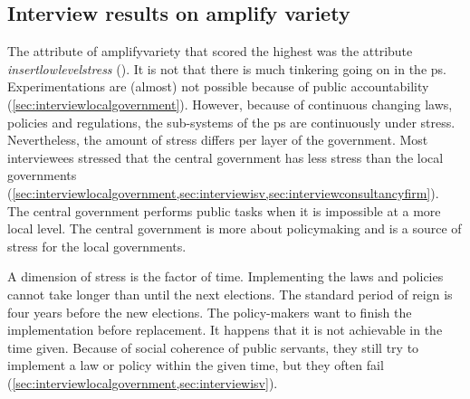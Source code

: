 \subsection{Interview results on amplify variety}
\label{sub:interviewresultsamplify}
The \gls{attribute} of \gls{amplifyvariety} that scored the highest was the \gls{attribute} \textit{\gls{insertlowlevelstress}} (). It is not that there is much tinkering going on in the \gls{ps}. Experimentations are (almost) not possible because of public accountability (\cref{sec:interviewlocalgovernment}). However, because of continuous changing laws, policies and regulations, the sub-systems of the \gls{ps} are continuously under stress. Nevertheless, the amount of stress differs per layer of the government. Most interviewees stressed that the central government has less stress than the local governments (\cref{sec:interviewlocalgovernment,sec:interviewisv,sec:interviewconsultancyfirm}). The central government performs public tasks when it is impossible at a more local level. The central government is more about policymaking and is a source of stress for the local governments. 

A dimension of stress is the factor of time. Implementing the laws and policies cannot take longer than until the next elections. The standard period of reign is four years before the new elections. The policy-makers want to finish the implementation before replacement. It happens that it is not achievable in the time given. Because of social coherence of public servants, they still try to implement a law or policy within the given time, but they often fail (\cref{sec:interviewlocalgovernment,sec:interviewisv}).


